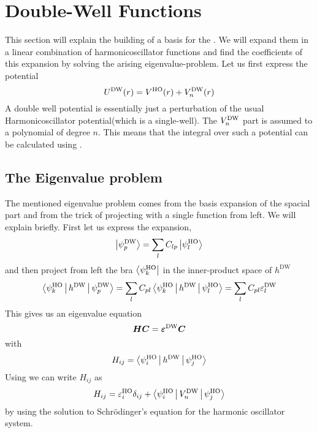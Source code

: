 \section{Double-Well Functions\label{sec:dwfunc}}
    This section will explain the building of a basis for the
    . We will expand them in a linear combination
    of harmonicoscillator functions and find the coefficients of this expansion
    by solving the arising eigenvalue-problem. Let us first express the
    potential
        \begin{equation}
            U^{\text{DW}}(r) = V^{\text{HO}}(r) + V^{\text{DW}}_n(r)
            \label{eq:UDW}
        \end{equation}
    A double well potential is essentially just a perturbation of the usual
    Harmonicoscillator potential(which is a single-well). The $V^{\text{DW}}_n$ part is
    assumed to a polynomial of degree $n$. This means that the integral over
    such a potential can be calculated using .

\subsection{The Eigenvalue problem}
    The mentioned eigenvalue problem comes from the basis expansion of the
    spacial part and from the trick of projecting with a single function from
    left. We will explain briefly. First let us express the expansion,
        \begin{equation}
            \ket{\psi^{\text{DW}}_p} = \sum\limits_{l}C_{lp}\ket{\psi^{\text{HO}}_l}
        \end{equation}
    and then project from left the bra $\bra{\psi^{\text{HO}}_k}$ in the
    inner-product space of $h^{\text{DW}}$
        \begin{equation}
            \Braket{\psi^{\text{HO}}_k|h^{\text{DW}}|\psi^{\text{DW}}_p} =
            \sum\limits_{l}C_{pl}\Braket{\psi^{\text{HO}}_k|h^{\text{DW}}|\psi^{\text{HO}}_l} =
            \sum\limits_{l}C_{pl}\varepsilon^{\text{DW}}_l
        \end{equation}
    This gives us an eigenvalue equation
        \begin{equation}
            \boldsymbol{{H}}\boldsymbol{{C}} = \boldsymbol{{\varepsilon^{\text{DW}}}}\boldsymbol{{C}}
        \end{equation}
    with
        \begin{equation}
            H_{ij} = \Braket{\psi^{\text{HO}}_i|h^{\text{DW}}|\psi^{\text{HO}}_j}
        \end{equation}
    Using  we can write $H_{ij}$ as
        \begin{equation}
            H_{ij} = \varepsilon^{\text{HO}}_i\delta_{ij} +
            \Braket{\psi^{\text{HO}}_i|V^{\text{DW}}_n|\psi^{\text{HO}}_j}
            \label{eq:Heigdef}
        \end{equation}
    by using the solution to Schrödinger's equation for the harmonic oscillator
    system. \\

